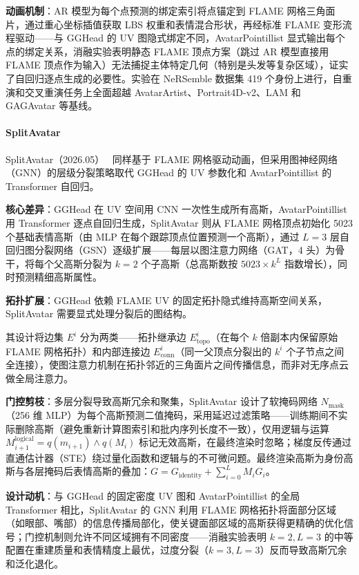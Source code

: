 \textbf{动画机制}：AR 模型为每个点预测的绑定索引将点锚定到 FLAME 网格三角面片，通过重心坐标插值获取 LBS 权重和表情混合形状，再经标准 FLAME 变形流程驱动——与 GGHead 的 UV 图隐式绑定不同，AvatarPointillist 显式输出每个点的绑定关系，消融实验表明静态 FLAME 顶点方案（跳过 AR 模型直接用 FLAME 顶点作为输入）无法捕捉主体特定几何（特别是头发等复杂区域），证实了自回归逐点生成的必要性。实验在 NeRSemble 数据集 419 个身份上进行，自重演和交叉重演任务上全面超越 AvatarArtist、Portrait4D-v2、LAM 和 GAGAvatar 等基线。

\paragraph{SplitAvatar}

SplitAvatar（2026.05）~\cite{2605_25751} 同样基于 FLAME 网格驱动动画，但采用图神经网络（GNN）的层级分裂策略取代 GGHead 的 UV 参数化和 AvatarPointillist 的 Transformer 自回归。

\textbf{核心差异}：GGHead 在 UV 空间用 CNN 一次性生成所有高斯，AvatarPointillist 用 Transformer 逐点自回归生成，SplitAvatar 则从 FLAME 网格顶点初始化 5023 个基础表情高斯（由 MLP 在每个跟踪顶点位置预测一个高斯），通过 $L{=}3$ 层自回归图分裂网络（GSN）逐级扩展——每层以图注意力网络（GAT，4 头）为骨干，将每个父高斯分裂为 $k{=}2$ 个子高斯（总高斯数按 $5023 \times k^L$ 指数增长），同时预测精细高斯属性。

\textbf{拓扑扩展}：GGHead 依赖 FLAME UV 的固定拓扑隐式维持高斯空间关系，SplitAvatar 需要显式处理分裂后的图结构。

其设计将边集 $E^i$ 分为两类——拓扑继承边 $E^i_{\text{topo}}$（在每个 $k$ 倍副本内保留原始 FLAME 网格拓扑）和内部连接边 $E^i_{\text{conn}}$（同一父顶点分裂出的 $k^i$ 个子节点之间全连接），使图注意力机制在拓扑邻近的三角面片之间传播信息，而非对无序点云做全局注意力。

\textbf{门控剪枝}：多层分裂导致高斯冗余和聚集，SplitAvatar 设计了软掩码网络 $N_{\text{mask}}$（256 维 MLP）为每个高斯预测二值掩码，采用延迟过滤策略——训练期间不实际删除高斯（避免重新计算图索引和批内序列长度不一致），仅用逻辑与运算 $M_{i+1}^{\text{logical}} = q(m_{i+1}) \wedge q(M_i)$ 标记无效高斯，在最终渲染时忽略；梯度反传通过直通估计器（STE）绕过量化函数和逻辑与的不可微问题。最终渲染高斯为身份高斯与各层掩码后表情高斯的叠加：$G = G_{\text{identity}} + \sum_{i=0}^{L} M_i G_i$。

\textbf{设计动机}：与 GGHead 的固定密度 UV 图和 AvatarPointillist 的全局 Transformer 相比，SplitAvatar 的 GNN 利用 FLAME 网格拓扑将面部分区域（如眼部、嘴部）的信息传播局部化，使关键面部区域的高斯获得更精确的优化信号；门控机制则允许不同区域拥有不同密度——消融实验表明 $k{=}2, L{=}3$ 的中等配置在重建质量和表情精度上最优，过度分裂（$k{=}3, L{=}3$）反而导致高斯冗余和泛化退化。

